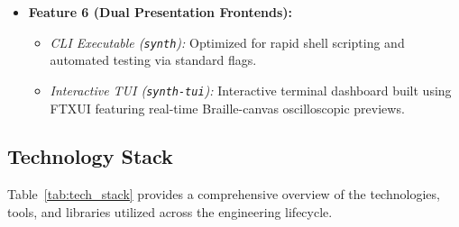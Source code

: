 \documentclass[12pt,a4paper,oneside]{book}
\begin{document}
\begin{itemize}
    \item \textbf{Feature 6 (Dual Presentation Frontends):}
    \begin{itemize}
        \item \textit{CLI Executable (\texttt{synth}):} Optimized for rapid shell scripting and automated testing via standard flags.
        \item \textit{Interactive TUI (\texttt{synth-tui}):} Interactive terminal dashboard built using FTXUI featuring real-time Braille-canvas oscilloscopic previews.
    \end{itemize}
\end{itemize}

\subsection{Technology Stack}
Table~\ref{tab:tech_stack} provides a comprehensive overview of the technologies, tools, and libraries utilized across the engineering lifecycle.
\end{document}
